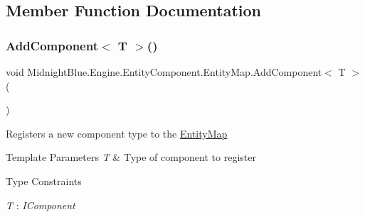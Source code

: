 \subsection{Member Function Documentation}
\hypertarget{class_midnight_blue_1_1_engine_1_1_entity_component_1_1_entity_map_aa4b52e535a775a3649416cb096a7c976}{}\label{class_midnight_blue_1_1_engine_1_1_entity_component_1_1_entity_map_aa4b52e535a775a3649416cb096a7c976} 
\subsubsection{\texorpdfstring{Add\+Component$<$ T $>$()}{AddComponent< T >()}}
{\footnotesize\ttfamily void Midnight\+Blue.\+Engine.\+Entity\+Component.\+Entity\+Map.\+Add\+Component$<$ T $>$ (\begin{DoxyParamCaption}{ }\end{DoxyParamCaption})\hspace{0.3cm}{\ttfamily [inline]}}



Registers a new component type to the \hyperlink{class_midnight_blue_1_1_engine_1_1_entity_component_1_1_entity_map}{Entity\+Map} 


\begin{DoxyTemplParams}{Template Parameters}
{\em T} & Type of component to register\\
\hline
\end{DoxyTemplParams}
\begin{Desc}
\item[Type Constraints]\begin{description}
\item[{\em T} : {\em I\+Component}]\end{description}
\end{Desc}
\hypertarget{class_midnight_blue_1_1_engine_1_1_entity_component_1_1_entity_map_a206e9f0753dd0b417075d7bbe35f18d7}{}\label{class_midnight_blue_1_1_engine_1_1_entity_component_1_1_entity_map_a206e9f0753dd0b417075d7bbe35f18d7} 

